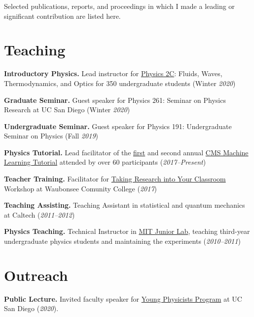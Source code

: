 \documentclass[11pt]{res}
\newcommand{\MarginText}[1]{\section{#1}\vspace{10pt}}
\begin{document}
\begin{resume}
Selected publications, reports, and proceedings in which I made a leading or significant contribution are listed here.\nocite{Albertsson:2018maf}

\vspace{10pt}
\printbibliography[heading=none,sorting=ynt,keyword={career}]


\MarginText{Teaching}

\textbf{Introductory Physics.} Lead instructor for
\href{https://jduarte.physics.ucsd.edu/phys2c/index.html}{Physics 2C}:
Fluids, Waves, Thermodynamics, and Optics for 350 undergraduate students
(Winter \textit{2020})

\textbf{Graduate Seminar.} Guest speaker for Physics 261:
Seminar on Physics Research at UC San Diego (Winter \textit{2020})

\textbf{Undergraduate Seminar.} Guest speaker for Physics 191:
Undergraduate Seminar on Physics (Fall \textit{2019})

\textbf{Physics Tutorial.} Lead facilitator of the
\href{https://indico.cern.ch/event/628146/}{first} and second annual \href{https://indico.cern.ch/event/726984/}{CMS Machine Learning
    Tutorial} attended by over 60 participants (\textit{2017--Present})

\textbf{Teacher Training.} Facilitator for
  \href{http://eddata.fnal.gov/lasso/program_search/show_workshopID_new.lasso?event_id=435}{Taking  Research into Your Classroom} Workshop at Waubonsee Comunity College (\textit{2017})

\textbf{Teaching Assisting.} Teaching Assistant in statistical and quantum mechanics at Caltech (\textit{2011--2012})

\textbf{Physics Teaching.} Technical Instructor in \href{http://web.mit.edu/8.13/www/index.shtml}{MIT Junior Lab}, teaching third-year
  undergraduate physics students and maintaining the experiments (\textit{2010--2011})



  \MarginText{Outreach}

\textbf{Public Lecture.} Invited faculty speaker for \href{http://ypp.ucsd.edu/}{Young Physicists Program} at UC
San Diego (\textit{2020}).


\end{resume}
\end{document}
